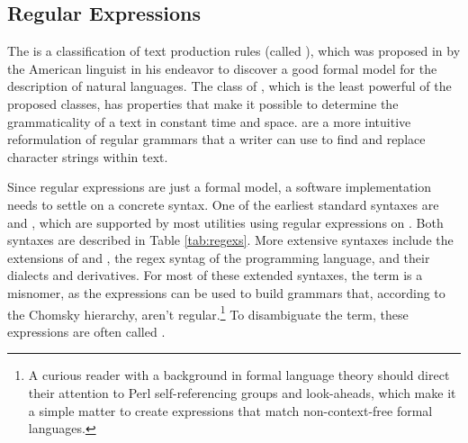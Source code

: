 \subsection{Regular Expressions}\label{sec:regexs}
The  is a classification of text production rules
(called ), which was proposed \cite{chomsky56} in
\citeyear{chomsky56} by the American linguist  in his
endeavor to discover a good formal model for the description of natural
languages. The class of , which is the least powerful
of the proposed classes, has properties that make it possible to determine the
grammaticality of a text in constant time and space.  are a more intuitive reformulation of regular grammars that a writer
can use to find and replace character strings within text.

Since regular expressions are just a formal model, a software implementation
needs to settle on a concrete syntax. One of the earliest standard syntaxes are
 and  \cite[part~1,~ch.\,9]{iso93:posix2}, which are
supported by most utilities using regular expressions on \Unices. Both syntaxes
are described in Table \ref{tab:regexs}. More extensive syntaxes include the
 extensions of  and , the regex syntag
of the  programming language, and their dialects and derivatives. For
most of these extended syntaxes, the term  is a misnomer, as the
expressions can be used to build grammars that, according to the Chomsky
hierarchy, aren't regular.\footnote{
  A curious reader with a background in formal language theory should direct
  their attention to Perl self-referencing groups and look-aheads, which make it
  a simple matter to create expressions that match non-context-free formal
  languages.
} To disambiguate the term, these expressions are often called
.

\begin{table}
  
  \label{tab:regexs}
\end{table}


